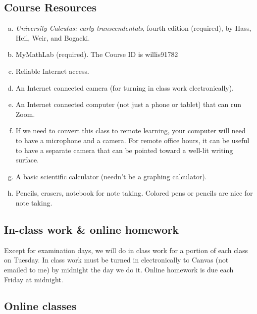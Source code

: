 \documentclass[12pt]{article}
\newcounter{ex}\setcounter{ex}{0}
\newenvironment{alphalist}{
  \begin{enumerate}[(a)]
    \addtolength{\itemsep}{-0.5\itemsep}}
  {\end{enumerate}}
\begin{document}
\newpage

\subsection*{Course Resources}

\begin{alphalist}

\item \emph{University Calculus: early transcendentals}, fourth edition (required), by Hass,  Heil, Weir, and Bogacki.

\item MyMathLab (required).  The Course ID is willis91782 

\item Reliable Internet access.

\item An Internet connected camera (for turning in class work electronically).

\item  An Internet connected computer (not just a phone or tablet) that can run Zoom. 

\item If we need to convert this class to remote learning, your computer will need to have a microphone and a camera. For remote office hours, it can be useful to have a separate camera that can be pointed toward a well-lit writing surface.

\item A basic scientific calculator (needn't be a graphing calculator).

\item Pencils, erasers, notebook for note taking. Colored pens or pencils are nice for note taking.

\end{alphalist}



\subsection*{In-class work \& online homework}

Except for examination days, we will do in class work for a portion 
of each class on Tuesday. In class work must be turned in 
electronically to Canvas (not emailed to me) by midnight the day we 
do it. Online homework is due each Friday at midnight. 

\subsection*{Online classes}
\end{document}
